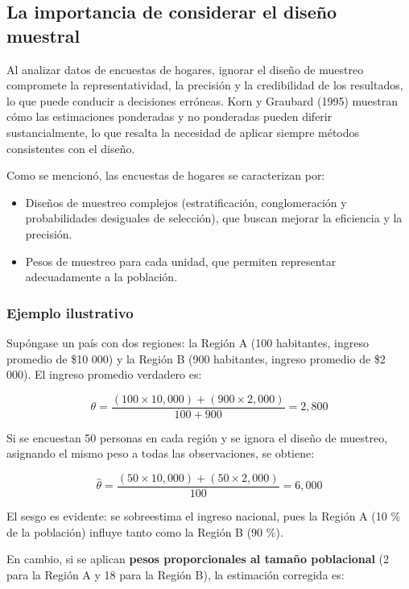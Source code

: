 \documentclass[
  12pt,
]{book}
\providecommand{\tightlist}{%
  \setlength{\itemsep}{0pt}\setlength{\parskip}{0pt}}
\begin{document}
\subsection{La importancia de considerar el diseño muestral}\label{la-importancia-de-considerar-el-diseuxf1o-muestral}

Al analizar datos de encuestas de hogares, ignorar el diseño de muestreo compromete la representatividad, la precisión y la credibilidad de los resultados, lo que puede conducir a decisiones erróneas. Korn y Graubard (1995) muestran cómo las estimaciones ponderadas y no ponderadas pueden diferir sustancialmente, lo que resalta la necesidad de aplicar siempre métodos consistentes con el diseño.

Como se mencionó, las encuestas de hogares se caracterizan por:

\begin{itemize}
\tightlist
\item
  Diseños de muestreo complejos (estratificación, conglomeración y probabilidades desiguales de selección), que buscan mejorar la eficiencia y la precisión.
\item
  Pesos de muestreo para cada unidad, que permiten representar adecuadamente a la población.
\end{itemize}

\subsubsection{Ejemplo ilustrativo}\label{ejemplo-ilustrativo}

Supóngase un país con dos regiones: la Región A (100 habitantes, ingreso promedio de \$10 000) y la Región B (900 habitantes, ingreso promedio de \$2 000). El ingreso promedio verdadero es:

\[
\theta = \frac{(100 \times 10,000) + (900 \times 2,000)}{100 + 900} = 2,800
\]

Si se encuestan 50 personas en cada región y se ignora el diseño de muestreo, asignando el mismo peso a todas las observaciones, se obtiene:

\[
\hat{\theta} = \frac{(50 \times 10,000) + (50 \times 2,000)}{100} = 6,000
\]

El sesgo es evidente: se sobreestima el ingreso nacional, pues la Región A (10 \% de la población) influye tanto como la Región B (90 \%).

En cambio, si se aplican \textbf{pesos proporcionales al tamaño poblacional} (2 para la Región A y 18 para la Región B), la estimación corregida es:
\end{document}
